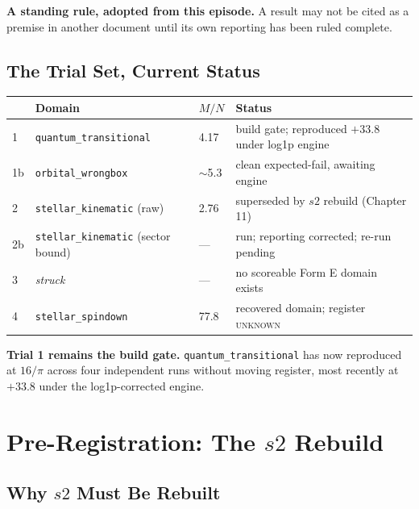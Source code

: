 \documentclass[11pt, letterpaper, openany]{book}
\newcommand{\MN}{M/N}
\begin{document}
\begin{warningbox}
\textbf{A standing rule, adopted from this episode.} A result may not be cited as a premise in
another document until its own reporting has been ruled complete. 
\end{warningbox}

\section{The Trial Set, Current Status}

\begin{table}[H]
\centering
\small
\begin{tabular}{@{}llll@{}}
\toprule
& \textbf{Domain} & \textbf{$\MN$} & \textbf{Status} \\
\midrule
1 & \texttt{quantum\_transitional} & 4.17 & build gate; reproduced $+33.8$ under log1p engine \\
1b & \texttt{orbital\_wrongbox} & $\sim$5.3 & clean expected-fail, awaiting engine \\
2 & \texttt{stellar\_kinematic} (raw) & 2.76 & superseded by $s2$ rebuild (Chapter 11) \\
2b & \texttt{stellar\_kinematic} (sector bound) & --- & run; reporting corrected; re-run pending \\
3 & \emph{struck} & --- & no scoreable Form E domain exists \\
4 & \texttt{stellar\_spindown} & 77.8 & recovered domain; register \textsc{unknown} \\
\bottomrule
\end{tabular}
\end{table}

\begin{predictionbox}
\textbf{Trial 1 remains the build gate.} \texttt{quantum\_transitional} has now reproduced at
$16/\pi$ across four independent runs without moving register, most recently at $+33.8$ under the
log1p-corrected engine. 
\end{predictionbox}

\chapter{Pre-Registration: The $s2$ Rebuild}

\section{Why $s2$ Must Be Rebuilt}
\end{document}
